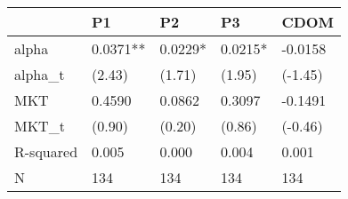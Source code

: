 \begin{tabular}{lllll}
\toprule
 & P1 & P2 & P3 & CDOM \\
\midrule
alpha & 0.0371** & 0.0229* & 0.0215* & -0.0158 \\
alpha_t & (2.43) & (1.71) & (1.95) & (-1.45) \\
MKT & 0.4590 & 0.0862 & 0.3097 & -0.1491 \\
MKT_t & (0.90) & (0.20) & (0.86) & (-0.46) \\
R-squared & 0.005 & 0.000 & 0.004 & 0.001 \\
N & 134 & 134 & 134 & 134 \\
\bottomrule
\end{tabular}
